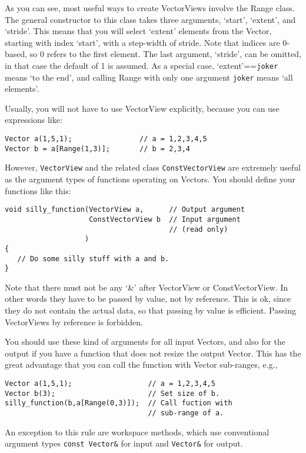 As you can see, most useful ways to create VectorViews involve the
Range class. The general constructor to this class takes three
arguments, `start', `extent', and `stride'. This means that you will
select `extent' elements from the Vector, starting with index `start',
with a step-width of stride. Note that indices are 0-based, so 0
refers to the first element. The last argument, `stride', can be
omitted, in that case the default of 1 is assumed. As a special case,
`extent'==\verb|joker| means `to the end', and calling Range with only one
argument \verb|joker| means `all elements'.

Usually, you will not have to use VectorView explicitly, because you
can use expressions like:

\begin{verbatim}
Vector a(1,5,1);                // a = 1,2,3,4,5
Vector b = a[Range(1,3)];       // b = 2,3,4
\end{verbatim}

However, \verb|VectorView| and the related class
\verb|ConstVectorView| are extremely useful as the argument types of
functions operating on Vectors. You should define your functions like
this:

\begin{verbatim}
void silly_function(VectorView a,      // Output argument
                    ConstVectorView b  // Input argument
                                       // (read only)
                   )
{
   // Do some silly stuff with a and b.
}
\end{verbatim}

Note that there must not be any `\&' after VectorView or
ConstVectorView. In other words they have to be passed by value, not
by reference. This is ok, since they do not contain the actual
data, so that passing by value is efficient. Passing VectorViews by
reference is forbidden.

You should use these kind of arguments for all input Vectors, and also
for the output if you have a function that does not resize the output
Vector. This has the great advantage that you can call the function
with Vector sub-ranges, e.g., 
\begin{verbatim}
Vector a(1,5,1);                  // a = 1,2,3,4,5
Vector b(3);                      // Set size of b.
silly_function(b,a[Range(0,3)]);  // Call fuction with
                                  // sub-range of a.
\end{verbatim}

An exception to this rule are workspace methods, which use
conventional argument types \verb|const Vector&| for input and
\verb|Vector&| for output.

